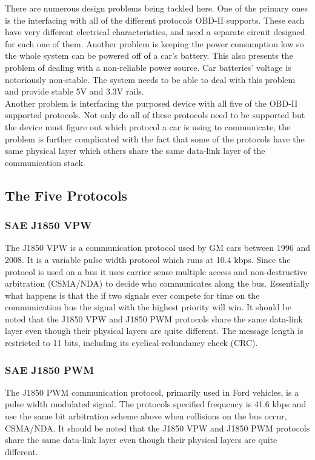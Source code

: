 \documentclass[12pt,letterpaper]{article}
\begin{document}
There are numerous design problems being tackled here. One of the primary ones is the interfacing with all of the different protocols OBD-II supports. These each have very different electrical characteristics, and need a separate circuit designed for each one of them. Another problem is keeping the power consumption low so the whole system can be powered off of a car's battery. This also presents the problem of dealing with a non-reliable power source. Car batteries' voltage is notoriously non-stable. The system needs to be able to deal with this problem and provide stable 5V and 3.3V rails. \\

Another problem is interfacing the purposed device with all five of the OBD-II supported protocols. Not only do all of these protocols need to be supported but the device must figure out which protocol a car is using to communicate, the problem is further complicated with the fact that some of the protocols have the same physical layer which others share the same data-link layer of the communication stack. 

\subsection{The Five Protocols}
\subsubsection{SAE J1850 VPW}
The J1850 VPW is a communication protocol used by GM cars between 1996 and 2008. It is a variable pulse width protocol which runs at 10.4 kbps. Since the protocol is used on a bus it uses carrier sense multiple access and non-destructive arbitration (CSMA/NDA) to decide who communicates along the bus. Essentially what happens is that the if two signals ever compete for time on the communication bus the signal with the highest priority will win. It should be noted that the J1850 VPW and J1850 PWM protocols share the same data-link layer even though their physical layers are quite different. The message length is restricted to 11 bits, including its cyclical-redundancy check (CRC).
 
\subsubsection{SAE J1850 PWM}
The J1850 PWM communication protocol, primarily used in Ford vehicles, is a pulse width modulated signal. The protocols specified frequency is 41.6 kbps and use the same bit arbitration scheme above when collisions on the bus occur, CSMA/NDA. It should be noted that the J1850 VPW and J1850 PWM protocols share the same data-link layer even though their physical layers are quite different.
\end{document}
